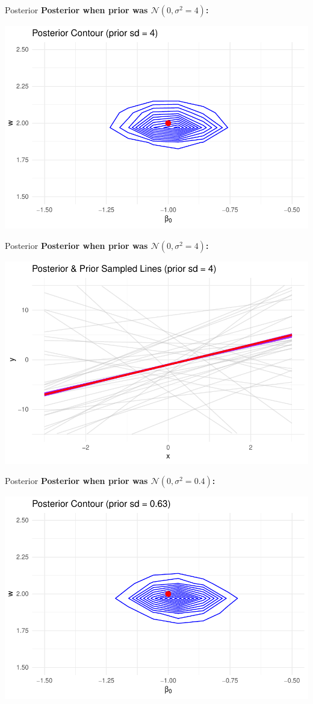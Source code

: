 \documentclass{beamer}
\begin{document}
\begin{frame}{Posterior}
  \textbf{Posterior when prior was \(\mathcal{N}(0, \sigma^2=4)\):}

  \begin{center}
    \includegraphics[width=0.8\linewidth]{posterior_contour_2.pdf}
  \end{center}
\end{frame}

\begin{frame}{Posterior}
  \textbf{Posterior when prior was \(\mathcal{N}(0, \sigma^2=4)\):}

  \begin{center}
    \includegraphics[width=0.8\linewidth]{posterior_lines_2.pdf}
  \end{center}
\end{frame}

\begin{frame}{Posterior}
  \textbf{Posterior when prior was \(\mathcal{N}(0, \sigma^2=0.4)\):}

  \begin{center}
    \includegraphics[width=0.8\linewidth]{posterior_contour_3.pdf}
  \end{center}
\end{frame}
\end{document}
